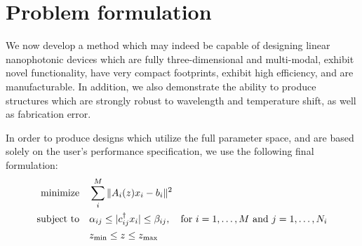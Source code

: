 \section{Problem formulation}
We now develop a method which may indeed be capable of designing 
    linear nanophotonic devices which
    are fully three-dimensional and multi-modal,
    exhibit novel functionality,
    have very compact footprints,
    exhibit high efficiency, and
    are manufacturable.
In addition, we also demonstrate the ability to produce structures
    which are strongly robust to wavelength and temperature shift,
    as well as fabrication error.

In order to produce designs which utilize the full parameter space,
    and are based solely on the user's performance specification,
    we use the following final formulation:
\begin{subequations}\begin{align}
    \operatorname*{\text{minimize}\quad} & \sum_i^M \|A_i(z)x_i - b_i\|^2 \\
    \text{subject to}\quad & \alpha_{ij} \le |c_{ij}^\dagger x_i| \le \beta_{ij}, \quad
        \text{for $i = 1, \ldots, M$ and $j = 1, \ldots, N_i$} \\
        &   z_\text{min} \le z \le z_\text{max}
\end{align} \label{problem}\end{subequations}

